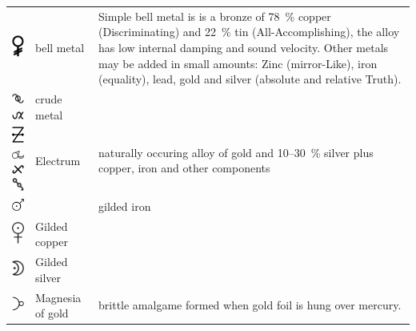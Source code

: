 \documentclass[british,final,landscape]{scrartcl}
\begin{document}
\begin{refsection}
\begin{supertabular}{p{0.3\textwidth}p{0.34\textwidth}p{0.34\textwidth}}
   \includegraphics[width=5mm]{Metals/BellMetal} & bell metal & Simple bell metal is is a bronze of \SI{78}{\%} copper (Discriminating) and \SI{22}{\%} tin (All-Accomplishing), the alloy has low internal damping and sound velocity. Other metals may be added in small amounts: Zinc (mirror-Like), iron (equality), lead, gold and silver (absolute and relative Truth).\\
   \includegraphics[width=5mm]{Metals/CrudeMetal} \includegraphics[width=5mm]{Metals/CrudeMetal2} & crude metal & \\
   \includegraphics[width=5mm]{Metals/Electrum} \includegraphics[width=5mm]{Metals/Electrum2} \includegraphics[width=5mm]{Metals/Electrum3} \includegraphics[width=5mm]{Metals/Electrum4} & Electrum & naturally occuring alloy of gold and \num{10}--\SI{30}{\%} silver plus copper, iron and other components\\
   \includegraphics[width=5mm]{Metals/FerrumAuretum} &  & gilded iron \\
   \includegraphics[width=5mm]{Metals/GildedCopper} & Gilded copper & \\
   \includegraphics[width=5mm]{Metals/GildedSilver} & Gilded silver & \\
   \includegraphics[width=5mm]{Metals/MagnesiaOfGold} & Magnesia of gold & brittle amalgame formed when gold foil is hung over mercury. \\

\end{supertabular}
\end{refsection}
\end{document}
